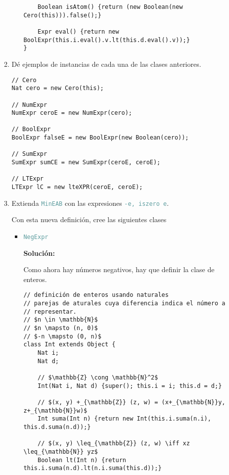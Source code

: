 \documentclass{article}
\newcommand{\tp}[1]{\textcolor{CadetBlue} {\texttt{#1}}}
\newcommand{\tb}[1]{\textcolor{RoyalPurple} {\textbf{#1}}}
\begin{document}
\begin{enumerate}
\begin{enumerate}
\begin{itemize}
\begin{verbatim}
    Boolean isAtom() {return (new Boolean(new Cero(this))).false();}

    Expr eval() {return new BoolExpr(this.i.eval().v.lt(this.d.eval().v));}
}
                \end{verbatim}

            \end{itemize}

            \item Dé ejemplos de instancias de cada una de las clases
            anteriores.

            \begin{verbatim}
// Cero
Nat cero = new Cero(this);

// NumExpr
NumExpr ceroE = new NumExpr(cero);

// BoolExpr
BoolExpr falseE = new BoolExpr(new Boolean(cero));

// SumExpr
SumExpr sumCE = new SumExpr(ceroE, ceroE);

// LTExpr
LTExpr lC = new lteXPR(ceroE, ceroE);
            \end{verbatim}

            \item Extienda \tp{MinEAB} con las expresiones \tp{-e, iszero e}.

            Con esta nueva definición, cree las siguientes clases

            \begin{itemize}
                \item \tp{NegExpr}

                \tb{Solución:}

                Como ahora hay números negativos, hay que definir la clase de
                enteros.

                \begin{verbatim}
// definición de enteros usando naturales
// parejas de aturales cuya diferencia indica el número a
// representar.
// $n \in \mathbb{N}$
// $n \mapsto (n, 0)$
// $-n \mapsto (0, n)$
class Int extends Object {
    Nat i;
    Nat d;

    // $\mathbb{Z} \cong \mathbb{N}^2$
    Int(Nat i, Nat d) {super(); this.i = i; this.d = d;}

    // $(x, y) +_{\mathbb{Z}} (z, w) = (x+_{\mathbb{N}}y, z+_{\mathbb{N}}w)$
    Int suma(Int n) {return new Int(this.i.suma(n.i), this.d.suma(n.d));}

    // $(x, y) \leq_{\mathbb{Z}} (z, w) \iff xz \leq_{\mathbb{N}} yz$
    Boolean lt(Int n) {return this.i.suma(n.d).lt(n.i.suma(this.d));}


\end{verbatim}
\end{itemize}
\end{enumerate}
\end{enumerate}
\end{document}
